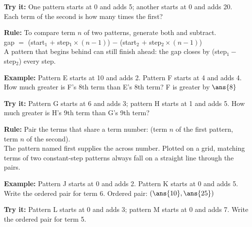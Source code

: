 \documentclass[12pt]{article}
\begin{document}
\begin{tryitbox}
\textbf{Try it:} \quad One pattern starts at 0 and adds 5; another starts at 0 and adds 20. Each term of the second is how many times the first?\\[2pt]
\end{tryitbox}


\begin{formulabox}
\textbf{Rule:} To compare term $n$ of two patterns, generate both and subtract.\\[3pt]
gap $=$ (start$_1$ $+$ step$_1 \times (n-1)$) $-$ (start$_2$ $+$ step$_2 \times (n-1)$)\\[3pt]
A pattern that begins behind can still finish ahead: the gap closes by (step$_1 -$ step$_2$) every step.
\end{formulabox}

\begin{examplebox}
\textbf{Example:} \quad Pattern E starts at 10 and adds 2. Pattern F starts at 4 and adds 4. How much greater is F's 8th term than E's 8th term?
F is greater by $\ans{8}$
\end{examplebox}

\begin{tryitbox}
\textbf{Try it:} \quad Pattern G starts at 6 and adds 3; pattern H starts at 1 and adds 5. How much greater is H's 9th term than G's 9th term?\\[2pt]
\end{tryitbox}


\begin{formulabox}
\textbf{Rule:} Pair the terms that share a term number: (term $n$ of the first pattern, term $n$ of the second).\\[3pt]
The pattern named first supplies the across number. Plotted on a grid, matching terms of two constant-step patterns always fall on a straight line through the pairs.
\end{formulabox}

\begin{examplebox}
\textbf{Example:} \quad Pattern J starts at 0 and adds 2. Pattern K starts at 0 and adds 5. Write the ordered pair for term 6.
Ordered pair: $(\ans{10}, \ans{25})$
\end{examplebox}

\begin{tryitbox}
\textbf{Try it:} \quad Pattern L starts at 0 and adds 3; pattern M starts at 0 and adds 7. Write the ordered pair for term 5.\\[2pt]
\end{tryitbox}
\end{document}
